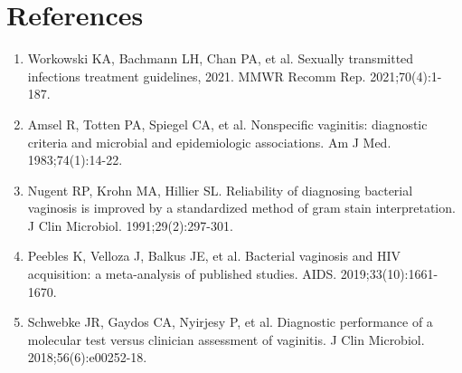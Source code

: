 \section*{References}
\begin{enumerate}
  \item Workowski KA, Bachmann LH, Chan PA, et al. Sexually transmitted infections treatment guidelines, 2021. MMWR Recomm Rep. 2021;70(4):1-187.
  \item Amsel R, Totten PA, Spiegel CA, et al. Nonspecific vaginitis: diagnostic criteria and microbial and epidemiologic associations. Am J Med. 1983;74(1):14-22.
  \item Nugent RP, Krohn MA, Hillier SL. Reliability of diagnosing bacterial vaginosis is improved by a standardized method of gram stain interpretation. J Clin Microbiol. 1991;29(2):297-301.
  \item Peebles K, Velloza J, Balkus JE, et al. Bacterial vaginosis and HIV acquisition: a meta-analysis of published studies. AIDS. 2019;33(10):1661-1670.
  \item Schwebke JR, Gaydos CA, Nyirjesy P, et al. Diagnostic performance of a molecular test versus clinician assessment of vaginitis. J Clin Microbiol. 2018;56(6):e00252-18.
\end{enumerate}

\clearpage
